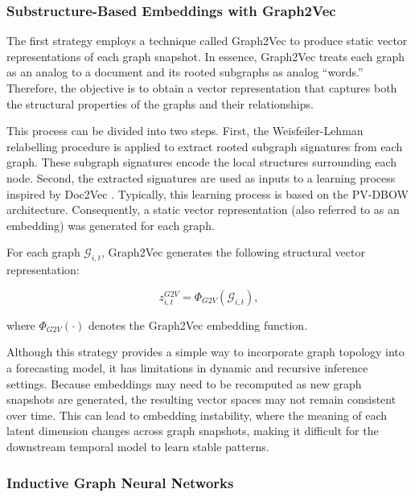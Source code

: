 \subsubsection{Substructure-Based Embeddings with Graph2Vec}

\label{subsubsec:graph2vec_embeddings}

The first strategy employs a technique called Graph2Vec to produce static vector representations of each graph snapshot. In essence, Graph2Vec treats each graph as an analog to a document and its rooted subgraphs as analog ``words.” Therefore, the objective is to obtain a vector representation that captures both the structural properties of the graphs and their relationships.

This process can be divided into two steps. First, the Weisfeiler-Lehman relabelling procedure is applied to extract rooted subgraph signatures from each graph. These subgraph signatures encode the local structures surrounding each node. Second, the extracted signatures are used as inputs to a learning process inspired by Doc2Vec \cite{le2014distributedrepresentationssentencesdocuments}. Typically, this learning process is based on the PV-DBOW architecture. Consequently, a static vector representation (also referred to as an embedding) was generated for each graph.

For each graph $\mathcal{G}_{i,t}$, Graph2Vec generates the following structural vector representation:

\begin{equation}
    z_{i,t}^{G2V} = \Phi_{G2V}\left(\mathcal{G}_{i,t}\right),
    \label{eq:graph2vec_embedding}
\end{equation}

where \(\Phi_{G2V}(\cdot)\) denotes the Graph2Vec embedding function.

Although this strategy provides a simple way to incorporate graph topology into a forecasting model, it has limitations in dynamic and recursive inference settings. Because embeddings may need to be recomputed as new graph snapshots are generated, the resulting vector spaces may not remain consistent over time. This can lead to embedding instability, where the meaning of each latent dimension changes across graph snapshots, making it difficult for the downstream temporal model to learn stable patterns.
\subsubsection{Inductive Graph Neural Networks}
\label{subsubsec:inductive_gnns}

